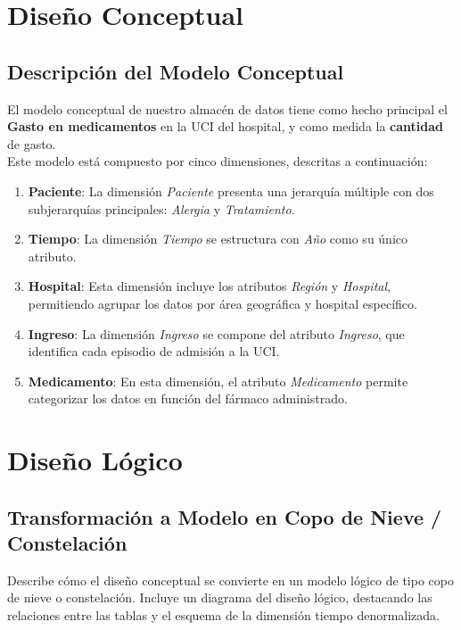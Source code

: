 \documentclass{article}
\begin{document}
\section{Diseño Conceptual}
\label{sec:diseno_conceptual}
\subsection{Descripción del Modelo Conceptual}

El modelo conceptual de nuestro almacén de datos tiene como hecho principal el \textbf{Gasto en medicamentos} en la UCI del hospital, y como medida la \textbf{cantidad} de gasto.
\\ 

Este modelo está compuesto por cinco dimensiones, descritas a continuación:

\begin{enumerate}
	\item \textbf{Paciente}: La dimensión \textit{Paciente} presenta una jerarquía múltiple con dos subjerarquías principales: \textit{Alergia} y \textit{Tratamiento}. 
	\item \textbf{Tiempo}: La dimensión \textit{Tiempo} se estructura con \textit{Año} como su único atributo.
	\item \textbf{Hospital}: Esta dimensión incluye los atributos \textit{Región} y \textit{Hospital}, permitiendo agrupar los datos por área geográfica y hospital específico.
	\item \textbf{Ingreso}: La dimensión \textit{Ingreso} se compone del atributo \textit{Ingreso}, que identifica cada episodio de admisión a la UCI.
	\item \textbf{Medicamento}: En esta dimensión, el atributo \textit{Medicamento} permite categorizar los datos en función del fármaco administrado.
\end{enumerate}



\section{Diseño Lógico}
\label{sec:diseno_logico}
\subsection{Transformación a Modelo en Copo de Nieve / Constelación}
Describe cómo el diseño conceptual se convierte en un modelo lógico de tipo copo de nieve o constelación. Incluye un diagrama del diseño lógico, destacando las relaciones entre las tablas y el esquema de la dimensión tiempo denormalizada.
\end{document}
